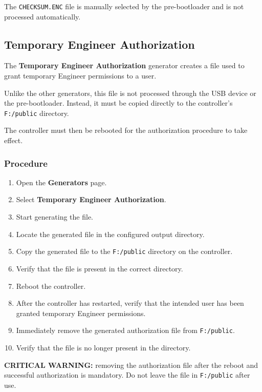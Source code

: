 ﻿\documentclass[11pt,a4paper]{article}
\newcommand{\button}[1]{\textbf{#1}}
\newcommand{\filename}[1]{\texttt{#1}}
\begin{document}
The \filename{CHECKSUM.ENC} file is manually selected by the
pre-bootloader and is not processed automatically.

\subsection{Temporary Engineer Authorization}

The \button{Temporary Engineer Authorization} generator creates
a file used to grant temporary Engineer permissions to a user.

Unlike the other generators, this file is not processed through
the USB device or the pre-bootloader. Instead, it must be copied
directly to the controller's \filename{F:/public} directory.

The controller must then be rebooted for the authorization
procedure to take effect.

\subsubsection*{Procedure}

\begin{enumerate}
    \item Open the \button{Generators} page.
    \item Select \button{Temporary Engineer Authorization}.
    \item Start generating the file.
    \item Locate the generated file in the configured output
    directory.
    \item Copy the generated file to the
    \filename{F:/public} directory on the controller.
    \item Verify that the file is present in the correct directory.
    \item Reboot the controller.
    \item After the controller has restarted, verify that the
    intended user has been granted temporary Engineer permissions.
    \item Immediately remove the generated authorization file
    from \filename{F:/public}.
    \item Verify that the file is no longer present in the directory.
\end{enumerate}

\textbf{CRITICAL WARNING:} removing the authorization file after
the reboot and successful authorization is mandatory. Do not leave
the file in \filename{F:/public} after use.
\end{document}

